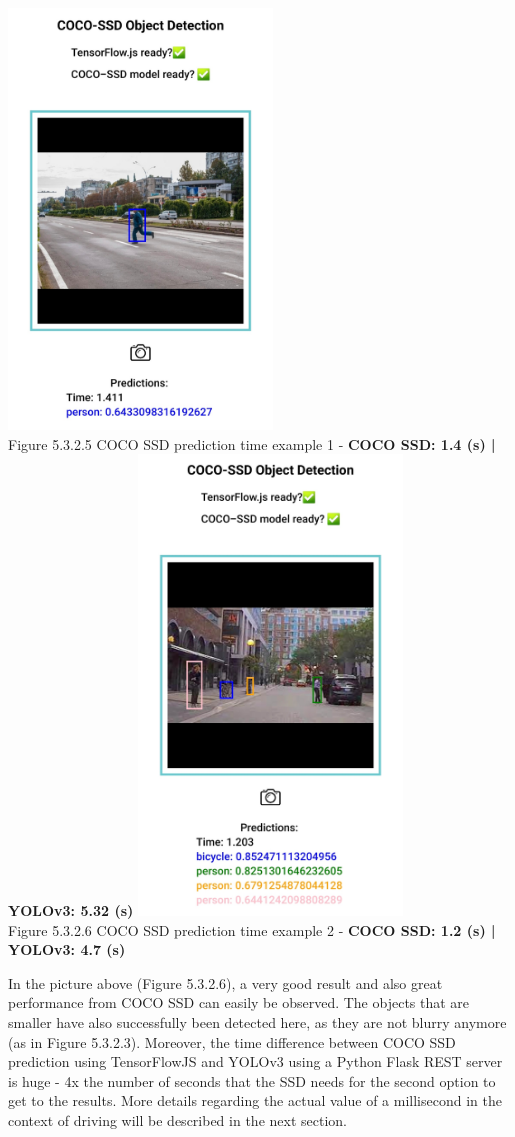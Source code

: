 \documentclass[runningheads,a4paper,11pt]{report}
\begin{document}
\begin{center}
\includegraphics[width=7cm]{images/screenshot2.jpg}\\
Figure 5.3.2.5 COCO SSD prediction time example 1 - \textbf{COCO SSD: 1.4 (s) | YOLOv3: 5.32 (s)}
\break
\break
\includegraphics[width=7cm]{images/screenshot3.jpg}\\ 
Figure 5.3.2.6 COCO SSD prediction time example 2 - \textbf{COCO SSD: 1.2 (s) | YOLOv3: 4.7 (s)}
\end{center}
In the picture above (Figure 5.3.2.6), a very good result and also great performance from COCO SSD can easily be observed. The objects that are smaller have also successfully been detected here, as they are not blurry anymore (as in Figure 5.3.2.3). Moreover, the time difference between COCO SSD prediction using TensorFlowJS and YOLOv3 using a Python Flask REST server is huge - 4x the number of seconds that the SSD needs for the second option to get to the results. More details regarding the actual value of a millisecond in the context of driving will be described in the next section. 
\end{document}
